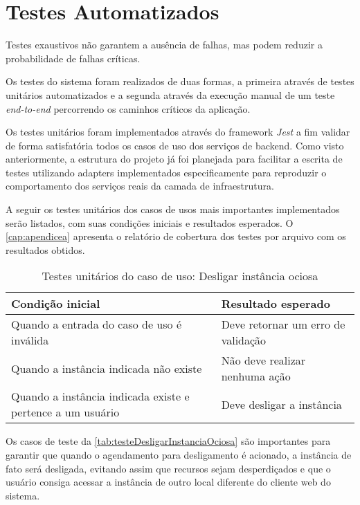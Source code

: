 \section{Testes Automatizados}
\label{sec:testesAutomatizados}

Testes exaustivos não garantem a ausência de falhas, mas podem reduzir a probabilidade de falhas críticas. \citep{pressman2016}

Os testes do sistema foram realizados de duas formas, a primeira através de testes unitários automatizados e a segunda através da execução manual de um teste \textit{end-to-end} percorrendo os caminhos críticos da aplicação.

Os testes unitários foram implementados através do framework \textit{Jest} a fim validar de forma satisfatória todos os casos de uso dos serviços de backend. Como visto anteriormente, a estrutura do projeto já foi planejada para facilitar a escrita de testes utilizando \glspl{adapter} implementados especificamente para reproduzir o comportamento dos serviços reais da camada de infraestrutura.

A seguir os testes unitários dos casos de usos mais importantes implementados serão listados, com suas condições iniciais e resultados esperados. O \autoref{cap:apendicea} apresenta o relatório de cobertura dos testes por arquivo com os resultados obtidos.

\begin{table}[h]
\caption{Testes unitários do caso de uso: Desligar instância ociosa}
\label{tab:testeDesligarInstanciaOciosa}
\begin{tabularx}{\textwidth}{p{} p{}}
\toprule
\textbf{Condição inicial} & \textbf{Resultado esperado} \\ \midrule

Quando a entrada do caso de uso é inválida & Deve retornar um erro de validação \\ \hline

Quando a instância indicada não existe & Não deve realizar nenhuma ação \\ \hline

Quando a instância indicada existe e pertence a um usuário & Deve desligar a instância \\ 

\bottomrule
\end{tabularx}
\end{table}

Os casos de teste da \autoref{tab:testeDesligarInstanciaOciosa} são importantes para garantir que quando o agendamento para desligamento é acionado, a instância de fato será desligada, evitando assim que recursos sejam desperdiçados e que o usuário consiga acessar a instância de outro local diferente do cliente web do sistema.


